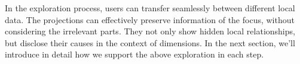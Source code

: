 In the exploration process, users can transfer seamlessly between different local data. The projections can effectively preserve information of the focus, without considering the irrelevant parts. They not only show hidden local relationships, but disclose their causes in the context of dimensions.  In the next section, we'll introduce in detail how we support the above exploration in each step.
